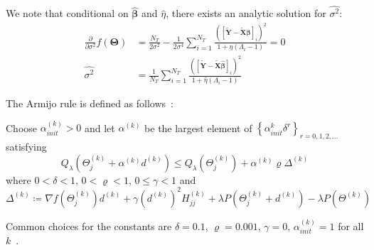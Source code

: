 \documentclass[12pt,letter]{article}\usepackage[]{graphicx}\usepackage[]{color}
\newcommand{\bX}{\textbf{X}}
\newcommand{\bY}{\textbf{Y}}
\newcommand{\bXtilde}{\widetilde{\bX}}
\newcommand{\bYtilde}{\widetilde{\bY}}
\newcommand{\bTheta}{\boldsymbol{\Theta}}
\newcommand{\bbeta}{\boldsymbol{\beta}}
\begin{document}
We note that conditional on $\widehat{\bbeta}$ and $\widehat{\eta}$, there exists an analytic solution for $\widehat{\sigma^2}$:
\begin{align}
	\frac{\partial}{\partial \sigma^2} f(\bTheta) &= \frac{N_T}{2\sigma^2}- \frac{1}{2\sigma^4} \sum_{i=1}^{N_T}\frac{([ \bYtilde - \bXtilde \bbeta]_i )^2}{1 + \eta (\Lambda_i-1)} = 0 \nonumber \\
	\widehat{\sigma^2} & = \frac{1}{N_T}\sum_{i=1}^{N_T}\frac{([ \bYtilde - \bXtilde \widehat{\bbeta}]_i )^2}{1 + \widehat{\eta} (\Lambda_i-1)} \label{eq:sigmahat}
\end{align}

The Armijo rule is defined as follows~\citep{tseng2009coordinate}:
\begin{tcolorbox}
	Choose $\alpha_{init}^{(k)}>0$ and let $\alpha^{(k)}$ be the largest element of $\left\lbrace \alpha_{init}^k \delta^r \right\rbrace_{r = 0,1,2,\ldots} $ satisfying
	\begin{equation}
		Q_{\lambda}(\Theta_j^{(k)} + \alpha^{(k)} d^{(k)}) \leq Q_{\lambda} (\Theta_j^{(k)}) + \alpha^{(k)}\varrho \Delta^{(k)}
	\end{equation}
	where $0 < \delta <1$, $0 < \varrho <1$, $0 \leq \gamma < 1$ and
	\begin{equation}
		\Delta^{(k)} \coloneqq \nabla f(\Theta_j^{(k)})d^{(k)} + \gamma (d^{(k)})^2 H^{(k)}_{jj} + \lambda P(\Theta_j^{(k)} + d^{(k)}) - \lambda P(\Theta^{(k)})
	\end{equation}
\end{tcolorbox}
Common choices for the constants are $\delta=0.1$, $\varrho=0.001$, $\gamma = 0$, $\alpha_{init}^{(k)} = 1$ for all $k$~\citep{schelldorfer2011estimation}.
\end{document}
